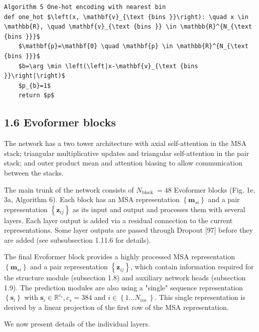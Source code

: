 \documentclass[10pt]{article}
\begin{document}
\begin{verbatim}
Algorithm 5 One-hot encoding with nearest bin
def one_hot $\left(x, \mathbf{v}_{\text {bins }}\right): \quad x \in \mathbb{R}, \quad \mathbf{v}_{\text {bins }} \in \mathbb{R}^{N_{\text {bins }}}$
    $\mathbf{p}=\mathbf{0} \quad \mathbf{p} \in \mathbb{R}^{N_{\text {bins }}}$
    $b=\arg \min \left(\left|x-\mathbf{v}_{\text {bins }}\right|\right)$
    $p_{b}=1$
    return $p$
\end{verbatim}

\subsection*{1.6 Evoformer blocks}
The network has a two tower architecture with axial self-attention in the MSA stack; triangular multiplicative updates and triangular self-attention in the pair stack; and outer product mean and attention biasing to allow communication between the stacks.

The main trunk of the network consists of $N_{\text {block }}=48$ Evoformer blocks (Fig. 1e, 3a, Algorithm 6). Each block has an MSA representation $\left\{\mathbf{m}_{s i}\right\}$ and a pair representation $\left\{\mathbf{z}_{i j}\right\}$ as its input and output and processes them with several layers. Each layer output is added via a residual connection to the current representations. Some layer outputs are passed through Dropout [97] before they are added (see subsubsection 1.11.6 for details).

The final Evoformer block provides a highly processed MSA representation $\left\{\mathbf{m}_{s i}\right\}$ and a pair representation $\left\{\mathbf{z}_{i j}\right\}$, which contain information required for the structure module (subsection 1.8) and auxiliary network heads (subsection 1.9). The prediction modules are also using a "single" sequence representation $\left\{\mathbf{s}_{i}\right\}$ with $\mathbf{s}_{i} \in \mathbb{R}^{c_{s}}, c_{s}=384$ and $i \in\left\{1 \ldots N_{\text {res }}\right\}$. This single representation is derived by a linear projection of the first row of the MSA representation.

We now present details of the individual layers.
\end{document}
